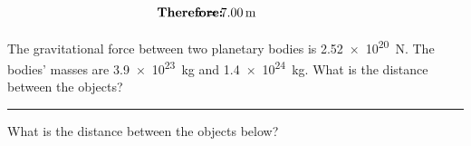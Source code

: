 \documentclass[main.tex]{subfiles}
\begin{document}
\begin{align*}
    \hspace{-3.5em} & \textbf{Therefore:} & \hspace{-3em} &
    r = \SI{7.00}{m}
\end{align*}


\begin{exercise} \label{dKPTLZ}
The gravitational force between two planetary bodies is \SI{2.52e20}{N}. The bodies' masses are \SI{3.9e23}{kg} and \SI{1.4e24}{kg}. What is the distance between the objects?
\end{exercise}


\hrule

\begin{exercise} \label{zw3NbF}
What is the distance between the objects below?

\begin{center}
    \centering
\end{center}
\end{exercise}



\cyanhrule
\end{document}
